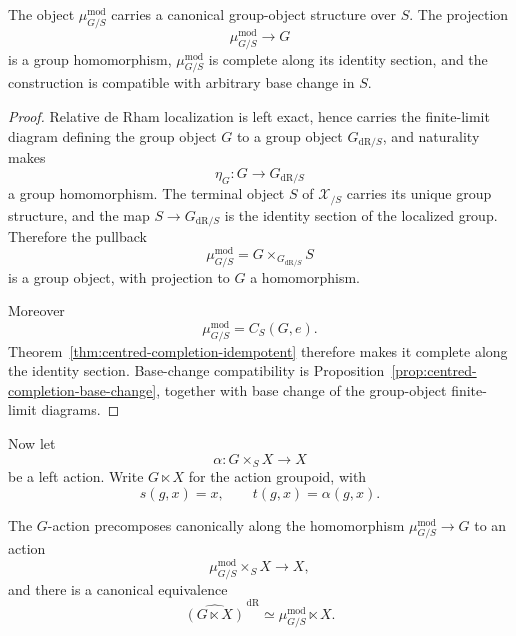 \begin{proposition}
\label{prop:formal-identity-group}
The object $\mu^{\mathrm{mod}}_{G/S}$ carries a canonical group-object
structure over $S$.  The projection
\[
    \mu^{\mathrm{mod}}_{G/S}\longrightarrow G
\]
is a group homomorphism, $\mu^{\mathrm{mod}}_{G/S}$ is complete along its
identity section, and the construction is compatible with arbitrary base
change in $S$.
\end{proposition}

\begin{proof}
Relative de Rham localization is left exact, hence carries the finite-limit
diagram defining the group object $G$ to a group object
$G_{\mathrm{dR}/S}$, and naturality makes
\[
    \eta_G:G\longrightarrow G_{\mathrm{dR}/S}
\]
a group homomorphism.  The terminal object $S$ of $\mathcal X_{/S}$ carries
its unique group structure, and the map
$S\to G_{\mathrm{dR}/S}$ is the identity section of the localized group.
Therefore the pullback
\[
    \mu^{\mathrm{mod}}_{G/S}
    =
    G\times_{G_{\mathrm{dR}/S}}S
\]
is a group object, with projection to $G$ a homomorphism.

Moreover
\[
    \mu^{\mathrm{mod}}_{G/S}
    =
    C_S(G,e).
\]
Theorem~\ref{thm:centred-completion-idempotent} therefore makes it complete
along the identity section.  Base-change compatibility is
Proposition~\ref{prop:centred-completion-base-change}, together with
base change of the group-object finite-limit diagrams.
\end{proof}

Now let
\[
    \alpha:G\times_SX\longrightarrow X
\]
be a left action.  Write $G\ltimes X$ for the action groupoid, with
\[
    s(g,x)=x,
    \qquad
    t(g,x)=\alpha(g,x).
\]

\begin{theorem}
\label{thm:action-groupoid-completion}
The $G$-action precomposes canonically along the homomorphism
$\mu^{\mathrm{mod}}_{G/S}\to G$ to an action
\[
    \mu^{\mathrm{mod}}_{G/S}\times_SX
    \longrightarrow X,
\]
and there is a canonical equivalence
\[
    \widehat{(G\ltimes X)}^{\,\mathrm{dR}}
    \simeq
    \mu^{\mathrm{mod}}_{G/S}\ltimes X.
\]
\end{theorem}

